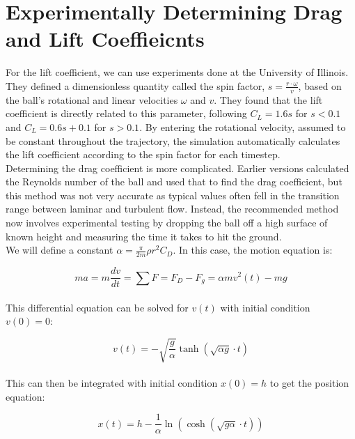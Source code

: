 \documentclass[a4paper]{article}
\begin{document}
	
	\section*{Experimentally Determining Drag and Lift Coeffieicnts}
	
	For the lift coefficient, we can use experiments done at the University of Illinois. They defined a dimensionless quantity called the spin factor, $ s = \frac{r \cdot \omega}{v} $, based on the ball's rotational and linear velocities $ \omega $ and $ v $. They found that the lift coefficient is directly related to this parameter, following $ C_L = 1.6 s $ for $ s < 0.1 $ and $ C_L = 0.6 s + 0.1 $ for $ s > 0.1 $. By entering the rotational velocity, assumed to be constant throughout the trajectory, the simulation automatically calculates the lift coefficient according to the spin factor for each timestep.\\
	
	Determining the drag coefficient is more complicated. Earlier versions calculated the Reynolds number of the ball and used that to find the drag coefficient, but this method was not very accurate as typical values often fell in the transition range between laminar and turbulent flow. Instead, the recommended method now involves experimental testing by dropping the ball off a high surface of known height and measuring the time it takes to hit the ground.\\
	
	We will define a constant $ \alpha = \frac{\pi}{2 m} \rho r^2 C_D  $. In this case, the motion equation is:
	
	\begin{equation}
		m a = m \frac{dv}{dt} = \sum F = F_D - F_g = \alpha m v^2 (t) - m g
	\end{equation}\\
	
	This differential equation can be solved for $ v(t) $ with initial condition $ v(0) = 0 $:
	
	\begin{equation}
		v(t) = -\sqrt{\frac{g}{\alpha}} \tanh \left( \sqrt{\alpha g} \cdot t \right)
	\end{equation}\\
	
	This can then be integrated with initial condition $ x(0) = h $ to get the position equation:
	
	\begin{equation}
		x(t) = h - \frac{1}{\alpha} \ln \left( \cosh \left( \sqrt{g \alpha} \cdot t \right) \right)
	\end{equation}\\
	
\end{document}
